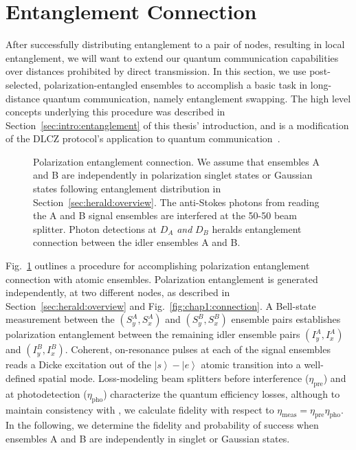\documentclass[aps,twocolumn,secnumarabic,amsmath,amssymb,pra,groupedaddress,
showpacs, showkeys]{revtex4-1}
\newcommand{\ket}[1]{\left|#1\right\rangle}
\newcommand{\pna}[1]{\left(#1\right)}
\begin{document}
\section{Entanglement Connection~\label{sec:herald:communication}}

After successfully distributing entanglement to a pair of nodes, resulting in
local entanglement, we will want to extend our quantum communication
capabilities over distances prohibited by direct transmission.  In this
section, we use post-selected, polarization-entangled ensembles to accomplish a
basic task in long-distance quantum communication, namely entanglement
swapping. The high level concepts underlying this procedure was described in
Section~\ref{sec:intro:entanglement} of this thesis' introduction, and
is a modification of the DLCZ protocol's application to quantum
communication~\cite{nature35106500}.

\begin{figure}[t]
	\centering
	\resizebox{5.00in}{!}{}
	\caption{Polarization entanglement connection. We assume that ensembles A and B are independently in polarization singlet states or Gaussian states following entanglement distribution in Section~\ref{sec:herald:overview}. The anti-Stokes photons from reading the A and B signal ensembles are interfered at the 50-50 beam splitter. Photon detections at $D_A$ \emph{and} $D_B$ heralds entanglement connection between the idler ensembles A and B.
	\label{fig:entanglement_connection}}
\end{figure}

Fig.~\ref{fig:entanglement_connection} outlines a procedure for accomplishing
polarization entanglement connection with atomic ensembles. Polarization
entanglement is generated independently, at two different nodes, as described
in Section~\ref{sec:herald:overview} and Fig.~\ref{fig:chap1:connection}. A
Bell-state measurement between the $\pna{S_y^A,S_x^A}$ and $\pna{S_y^B,S_x^B}$
ensemble pairs establishes polarization entanglement between the remaining
idler ensemble pairs $\pna{I_y^A,I_x^A}$ and $\pna{I_y^B,I_x^B}$. Coherent,
on-resonance pulses at each of the signal ensembles reads a Dicke excitation
out of the $\ket{s}-\ket{e}$ atomic transition into a well-defined spatial
mode. Loss-modeling beam splitters before interference ($\eta_{\textrm{pre}}$)
and at photodetection ($\eta_{\textrm{pho}}$) characterize the quantum
efficiency losses, although to maintain consistency with
\cite{PhysRevA.73.042303}, we calculate fidelity with respect to
$\eta_{\textrm{meas}}=\eta_{\textrm{pre}}\eta_{\textrm{pho}}$. In the
following, we determine the fidelity and probability of success when ensembles
A and B are independently in singlet or Gaussian states.
\end{document}
